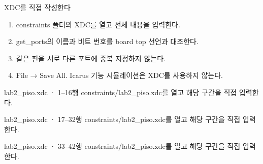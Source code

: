 \begin{frame}{XDC를 직접 작성한다}
\small
\begin{enumerate}
\item constraints 폴더의 XDC를 열고 전체 내용을 입력한다.
\item get\_ports의 이름과 비트 번호를 board top 선언과 대조한다.
\item 같은 핀을 서로 다른 포트에 중복 지정하지 않는다.
\item File → Save All. Icarus 기능 시뮬레이션은 XDC를 사용하지 않는다.
\end{enumerate}
\end{frame}

\begin{frame}{lab2\_piso.xdc · 1–16행}
\small
constraints/lab2\_piso.xdc를 열고 해당 구간을 직접 입력한다.\par\vspace{0.4cm}\par\vspace{0.4cm}
\end{frame}

\begin{frame}{lab2\_piso.xdc · 17–32행}
\small
constraints/lab2\_piso.xdc를 열고 해당 구간을 직접 입력한다.\par\vspace{0.4cm}\par\vspace{0.4cm}
\end{frame}

\begin{frame}{lab2\_piso.xdc · 33–42행}
\small
constraints/lab2\_piso.xdc를 열고 해당 구간을 직접 입력한다.\par\vspace{0.4cm}\par\vspace{0.4cm}
\end{frame}

